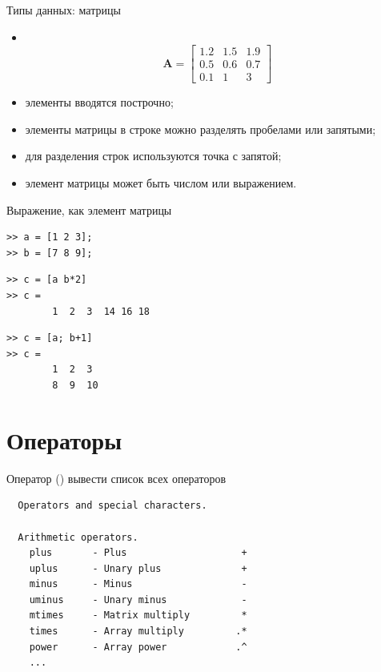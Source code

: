 \documentclass[11pt, compress]{beamer}
\begin{document}
\begin{frame}[fragile]{Типы данных: матрицы}
  \begin{itemize}
   \item {} \\
  $$\boldsymbol A=\begin{bmatrix}1.2 & 1.5 & 1.9 \\ 0.5 & 0.6 & 0.7 \\ 0.1 & 1 & 3\end{bmatrix}$$
   \item элементы вводятся построчно;
   \item элементы матрицы в строке можно разделять пробелами или запятыми;
   \item для разделения строк используются точка с запятой;
   \item элемент матрицы может быть числом или выражением.
  \end{itemize}
\end{frame}

\begin{frame}[fragile]{Выражение, как элемент матрицы}
\begin{lstlisting}
>> a = [1 2 3];
>> b = [7 8 9];
\end{lstlisting}  

\begin{lstlisting}
>> c = [a b*2]
>> c =
        1  2  3  14 16 18
\end{lstlisting}        

\begin{lstlisting}
>> c = [a; b+1]
>> c =
        1  2  3
        8  9  10
\end{lstlisting}
\end{frame}


\section{Операторы}
\begin{frame}[fragile]{Оператор ()}
   вывести список всех операторов \\ \vspace{10pt}
\begin{verbatim}
  Operators and special characters.
 
  Arithmetic operators.
    plus       - Plus                    +    
    uplus      - Unary plus              +    
    minus      - Minus                   -    
    uminus     - Unary minus             -    
    mtimes     - Matrix multiply         *    
    times      - Array multiply         .*        
    power      - Array power            .^    
    ...
\end{verbatim}    
\end{frame}
\end{document}

